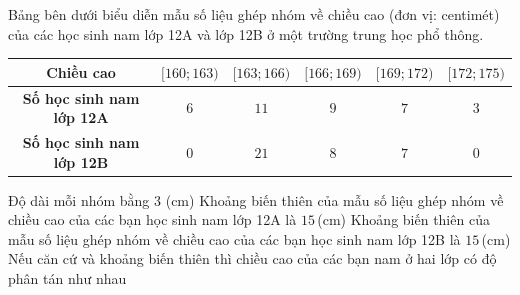 \begin{ex}%

Bảng bên dưới biểu diễn mẫu số liệu ghép nhóm về chiều cao (đơn vị: centimét) của các học sinh nam lớp 12A và lớp 12B ở một trường trung học phổ thông.
\begin{center}
\begin{tabular}{|c|c|c|c|c|c|}
\hline
\textbf{Chiều cao} & $[160;163)$ & $[163; 166)$ & $[166;169)$ & $[169;172)$ & $[172;175)$\\
\hline
\textbf{Số học sinh nam lớp 12A} & $6$ & $11$ & $9$ & $7$ & $3$ \\
\hline
\textbf{Số học sinh nam lớp 12B} & $0$ & $21$ & $8$ & $7$ & $0$\\
\hline
\end{tabular}
\end{center}
\choiceTF
{\True Độ dài mỗi nhóm bằng $3$ (cm)}
{\True Khoảng biến thiên của mẫu số liệu ghép nhóm về chiều cao của các bạn học sinh nam lớp 12A là $15$\,(cm)}
{Khoảng biến thiên của mẫu số liệu ghép nhóm về chiều cao của các bạn học sinh nam lớp 12B là $15$\,(cm)}
{Nếu căn cứ và khoảng biến thiên thì chiều cao của các bạn nam ở hai lớp có độ phân tán như nhau}
\end{ex}

